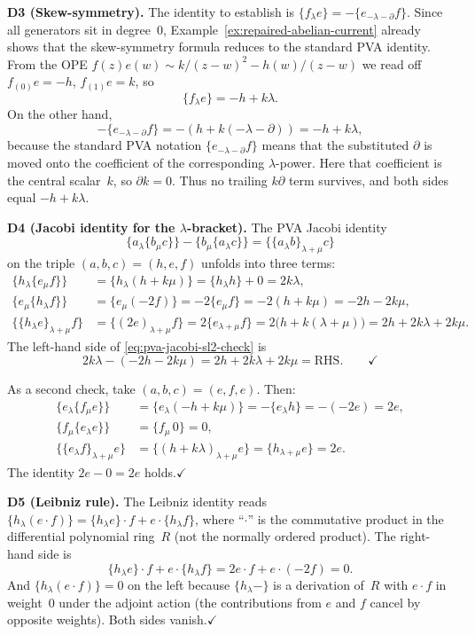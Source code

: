 \begin{example}
\smallskip
\noindent\textbf{D3 (Skew-symmetry).}
The identity to establish is $\{f_\lambda e\}=-\{e_{-\lambda-\partial}f\}$.
Since all generators sit in degree~$0$,
Example~\ref{ex:repaired-abelian-current} already shows
that the skew-symmetry formula reduces to the standard PVA identity.
From the OPE $f(z)e(w)\sim k/(z{-}w)^2-h(w)/(z{-}w)$
we read off $f_{(0)}e=-h$, $f_{(1)}e=k$, so
\[
\{f_\lambda e\}=-h+k\lambda.
\]
On the other hand,
\[
-\{e_{-\lambda-\partial}f\}
=
-(h+k(-\lambda-\partial))
=
-h+k\lambda,
\]
because the standard PVA notation
$\{e_{-\lambda-\partial}f\}$ means that the substituted
$\partial$ is moved onto the coefficient of the corresponding
$\lambda$-power. Here that coefficient is the central scalar~$k$,
so $\partial k=0$. Thus no trailing $k\partial$ term survives, and
both sides equal $-h+k\lambda$.

\smallskip
\noindent\textbf{D4 (Jacobi identity for the $\lambda$-bracket).}
The PVA Jacobi identity
\begin{equation}
\label{eq:pva-jacobi-sl2-check}
\{a_\lambda\{b_\mu c\}\}
-
\{b_\mu\{a_\lambda c\}\}
=
\{\{a_\lambda b\}_{\lambda+\mu}c\}
\end{equation}
on the triple $(a,b,c)=(h,e,f)$ unfolds into three terms:
\begin{align*}
\{h_\lambda\{e_\mu f\}\}
&=
\{h_\lambda(h+k\mu)\}
=
\{h_\lambda h\}+0
=
2k\lambda,
\\[4pt]
\{e_\mu\{h_\lambda f\}\}
&=
\{e_\mu(-2f)\}
=
-2\{e_\mu f\}
=
-2(h+k\mu)
=
-2h-2k\mu,
\\[4pt]
\{\{h_\lambda e\}_{\lambda+\mu}f\}
&=
\{(2e)_{\lambda+\mu}f\}
=
2\{e_{\lambda+\mu}f\}
=
2\bigl(h+k(\lambda+\mu)\bigr)
=
2h+2k\lambda+2k\mu.
\end{align*}
The left-hand side of \eqref{eq:pva-jacobi-sl2-check} is
\[
2k\lambda-(-2h-2k\mu)
=
2h+2k\lambda+2k\mu
=
\text{RHS}.\qquad\checkmark
\]

As a second check, take $(a,b,c)=(e,f,e)$. Then:
\begin{align*}
\{e_\lambda\{f_\mu e\}\}
&=
\{e_\lambda(-h+k\mu)\}
=
-\{e_\lambda h\}
=
-(-2e)
=
2e,
\\[4pt]
\{f_\mu\{e_\lambda e\}\}
&=
\{f_\mu\,0\}
=
0,
\\[4pt]
\{\{e_\lambda f\}_{\lambda+\mu}e\}
&=
\{(h+k\lambda)_{\lambda+\mu}e\}
=
\{h_{\lambda+\mu}e\}
=
2e.
\end{align*}
The identity $2e-0=2e$ holds.\quad$\checkmark$

\smallskip
\noindent\textbf{D5 (Leibniz rule).}
The Leibniz identity reads $\{h_\lambda(e\cdot f)\}=\{h_\lambda e\}\cdot f+e\cdot\{h_\lambda f\}$,
where ``$\cdot$'' is the commutative product in the differential polynomial ring~$R$
(not the normally ordered product).
The right-hand side is
\[
\{h_\lambda e\}\cdot f+e\cdot\{h_\lambda f\}
=
2e\cdot f+e\cdot(-2f)
=
0.
\]
And $\{h_\lambda(e\cdot f)\}=0$ on the left because $\{h_\lambda-\}$ is a derivation
of~$R$ with $e\cdot f$ in weight~$0$ under the adjoint action
(the contributions from $e$ and $f$ cancel by opposite weights).
Both sides vanish.\quad$\checkmark$


\end{example}
